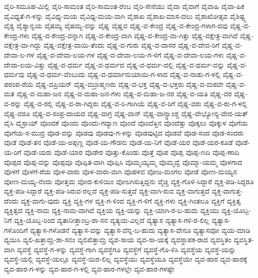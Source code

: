 ವೈರಿ-ಸಮೂಹ-ಮಿಲ್ಲಿ
ವೈರಿ-ಸಾಮಂತ
ವೈರಿ-ಸಾಮಂತ-ರೆಂಬ
ವೈರಿ-ಸೇನೆಯು
ವೈವಾ
ವೈವಾಗೆ
ವೈವಾಹಿ
ವೈವಾ-ಹಿಕ
ವೈವಿಧ್ಯತೆ-ಗ-ಳನ್ನು
ವೈವಿಧ್ಯ-ಮಯ
ವೈವಿಧ್ಯ-ಮಯ-ವಾಗಿ
ವೈಶಾಖ
ವೈಶಾಖ-ಮಾಸ-ದಲು
ವೈಶಾಖೋತ್ಸವ
ವೈಶಿಷ್ಟ್ಯ
ವೈಶ್ಯ
ವೈಶ್ಯಾನ್ವಯ
ವೈಷಮ್ಯ
ವೈಷಮ್ಯ-ವನ್ನು
ವೈಷ್ಣ
ವೈಷ್ಣವ
ವೈಷ್ಣ-ವ-ಕೇಂದ್ರ
ವೈಷ್ಣ-ವ-ಕೇಂದ್ರ-ಗಳಾಗ-ದವು
ವೈಷ್ಣ-ವ-ಕೇಂದ್ರ-ಗಳು
ವೈಷ್ಣ-ವ-ಕೇಂದ್ರ-ವನ್ನಾಗಿ
ವೈಷ್ಣ-ವ-ಕೇಂದ್ರ-ವಾಗಿ
ವೈಷ್ಣ-ವ-ಕೇಂದ್ರ-ವಾ-ಗಿತ್ತು
ವೈಷ್ಣ-ವಕ್ಷೇತ್ರ-ವಾಗಿದೆ
ವೈಷ್ಣ-ವಕ್ಷೇತ್ರ-ವಾ-ಗಿದ್ದು
ವೈಷ್ಣ-ವಕ್ಷೇತ್ರ-ವಾಯಿ-ತೆಂದು
ವೈಷ್ಣ-ವ-ಗುರು
ವೈಷ್ಣ-ವ-ದಾಸರ
ವೈಷ್ಣ-ವ-ದೇವ-ರಿಗೆ
ವೈಷ್ಣ-ವ-ದೇವಾ-ಲ-ಗಳ
ವೈಷ್ಣ-ವ-ದೇವಾ-ಲಯ-ಗಳ
ವೈಷ್ಣ-ವ-ದೇವಾ-ಲಯ-ಗ-ಳಿಗೆ
ವೈಷ್ಣ-ವ-ದೇವಾ-ಲಯ-ಗಳು
ವೈಷ್ಣ-ವ-ದೇವಾ-ಲಯ-ವಿತ್ತು
ವೈಷ್ಣ-ವ-ಧರ್ಮ
ವೈಷ್ಣ-ವ-ಧರ್ಮದ
ವೈಷ್ಣ-ವ-ಧರ್ಮ-ದಲ್ಲಿ
ವೈಷ್ಣ-ವ-ಧರ್ಮ-ವನ್ನು
ವೈಷ್ಣ-ವ-ಧರ್ಮವು
ವೈಷ್ಣ-ವ-ಧರ್ಮ-ವೆಂಬುದು
ವೈಷ್ಣ-ವ-ಧರ್ಮಾನುಯಾಯಿ-ಗ-ಳಾದ
ವೈಷ್ಣ-ವ-ನಾಡು-ಗ-ಳಲ್ಲಿ
ವೈಷ್ಣ-ವ-ಪರಂಪ-ರೆಯ
ವೈಷ್ಣ-ವಪ್ರಿಯನ್
ವೈಷ್ಣ-ವಬ್ರಾಹ್ಮಣರು
ವೈಷ್ಣ-ವ-ಭಕ್ತ
ವೈಷ್ಣ-ವ-ಭಕ್ತರು
ವೈಷ್ಣ-ವ-ಮಠವೇ
ವೈಷ್ಣ-ವ-ಮತ
ವೈಷ್ಣ-ವ-ಮಹಾ-ಜನ
ವೈಷ್ಣ-ವ-ಮಹಾ-ಜನ-ಗಳು
ವೈಷ್ಣ-ವ-ಮಹಾ-ಜ-ನರ
ವೈಷ್ಣ-ವ-ಯತಿ
ವೈಷ್ಣ-ವರ
ವೈಷ್ಣ-ವ-ರನ್ನು
ವೈಷ್ಣ-ವ-ರಲ್ಲಿ
ವೈಷ್ಣ-ವ-ರಾ-ಗಿದ್ದರು
ವೈಷ್ಣ-ವ-ರಿ-ಗಾಗಿಯೆ
ವೈಷ್ಣ-ವ-ರಿಗೆ
ವೈಷ್ಣ-ವರು
ವೈಷ್ಣ-ವ-ರು-ಗ-ಳಲ್ಲಿ
ವೈಷ್ಣ-ವರೂ
ವೈಷ್ಣ-ವ-ಸಂಪ್ರ-ದಾಯದ
ವೈಷ್ಣ-ವಾಗ್ರ
ವೈಷ್ಣ-ವಾನ್
ವೈಷ್ಣ-ವಾನ್ಸ್ತಾಂಶ್ಚ
ವೈಷ್ಣ-ವೇಭ್ಯೋನ್ಯ-ವೇದ-ಯತ್
ವೈಸಿ
ವೈಸ್ರಾಯ್
ವೊಂದಕೆ
ವೊಂದು
ವೊಂದು-ಗದ್ಯಾಣ
ವೊಂದೆ
ವೊಂದೆತ್ತಿನ
ವೊಂದೆತ್ತು
ವೊಕ್ಕಲು
ವೊಕ್ಕುಳ
ವೊಗೆಯ
ವೊಗೆಯ-ಸ-ಮುದ್ರ
ವೊಡ-ವನ್ನು
ವೊಡವು
ವೊಡವು-ಗ-ಳನ್ನು
ವೊಡವುಟ್ಟಿದ
ವೊಡವೆ
ವೊಡ-ಸಂದ
ವೊಡ-ಸಂದರು
ವೊಡೆ
ವೊಡೆ-ತನ
ವೊಡೆ-ಯ-ಅಪ್ಪಣ್ಣ
ವೊಡೆ-ಯ-ಗೌಡನು
ವೊಡೆ-ಯ-ನಿಗೆ
ವೊಡೆ-ಯರ
ವೊಡೆ-ಯರ-ಕೂಡೆ
ವೊಡೆ-ಯ-ರಿಗೆ
ವೊಡೆ-ಯರು
ವೊಡೆ-ಯಾರ
ವೊಡೇರ
ವೊತ್ತು-ಕೊಂಡು
ವೊತ್ತೆ
ವೊಪ
ವೊಪ್ಪ
ವೊಪ್ಪ-ಣದಿ
ವೊಪ್ಪ-ಣಾದಿ
ವೊಪ್ಪದ
ವೊಪ್ಪ-ವನ್ನು
ವೊಪ್ಪವೂ
ವೊಪ್ಪಿತ-ವಾಗಿ
ವೊಪ್ಪಿಸಿ
ವೊಮ್ಮಯ್ಯಮ್ಮ
ವೊಮ್ಮವ್ವೆ
ವೊಮ್ಮಾ-ಯಮ್ಮ
ವೊಳಗಾದ
ವೊಳಗೆ
ವೊಳಗೆ-ರೆಯ
ವೊಳ-ವಾರು
ವೊಳ-ವಾರು-ವಾಗಿ
ವೊಹಳವ
ವೋಜ-ಮಂಗಲ
ವೋಡೆ
ವೋಣ-ಮಯ್ಯನ
ವೋಣ-ಮಯ್ಯ-ನೆಂದು
ವೋತ್ತಮ
ವೋದ-ಕುಳಿಯಿಂ
ವೋಲಗಿಸುತ್ತಿದ್ದನು
ವ್ಮೆಚ್ಚಿ
ವ್ಯಕ್ತ-ಗೊಳಿ-ಸಿದ್ದಾರೆ
ವ್ಯಕ್ತ-ಪಡಿ-ಸಿದ್ದರೂ
ವ್ಯಕ್ತ-ಪಡಿ-ಸಿದ್ದಾರೆ
ವ್ಯಕ್ತ-ಪಡಿ-ಸಿರುವ-ರಲ್ಲದೆ
ವ್ಯಕ್ತ-ಪಡಿ-ಸುತ್ತದೆ
ವ್ಯಕ್ತ-ವಾಗಿ-ರುವ
ವ್ಯಕ್ತ-ವಾಗುತ್ತದೆ
ವ್ಯಕ್ತ-ವಾಗುತ್ತ-ದೆಂದು
ವ್ಯಕ್ತ-ವಾಗು-ವುದು
ವ್ಯಕ್ತಿ
ವ್ಯಕ್ತಿ-ಗಳ
ವ್ಯಕ್ತಿ-ಗ-ಳಿಂದ
ವ್ಯಕ್ತಿ-ಗ-ಳಿಗೆ
ವ್ಯಕ್ತಿ-ಗಳು
ವ್ಯಕ್ತಿ-ಗಿಂತಲೂ
ವ್ಯಕ್ತಿಗೆ
ವ್ಯಕ್ತಿತ್ವ
ವ್ಯಕ್ತಿತ್ವದ
ವ್ಯಕ್ತಿ-ನಾಮ
ವ್ಯಕ್ತಿ-ನಾಮ-ವಾಗಿದೆ
ವ್ಯಕ್ತಿಯ
ವ್ಯಕ್ತಿ-ಯನ್ನು
ವ್ಯಕ್ತಿ-ಯಾಗಿ-ರ-ಬ-ಹುದು
ವ್ಯಕ್ತಿಯು
ವ್ಯಕ್ತಿ-ಯೊಬ್ಬ-ನಿಗೆ
ವ್ಯಕ್ತಿ-ಯೊಬ್ಬ-ರಿಂದ
ವ್ಯತಾನೀತ್ತಾಂಬ್ರ-ಶಾ-ಸನ
ವ್ಯತ್ಯಯ-ವಿಲ್ಲದೆ
ವ್ಯತ್ಯಾಸ
ವ್ಯತ್ಯಾಸ-ಗಳಿ-ರ-ಲಿಲ್ಲ
ವ್ಯತ್ಯಾಸ-ಗಳೊಂದಿಗೆ
ವ್ಯತ್ಯಾಸ-ಗಳೊಡನೆ
ವ್ಯತ್ಯಾಸ-ವನ್ನು
ವ್ಯತ್ಯಾಸ-ವೆನ್ನ-ಬ-ಹುದು
ವ್ಯತ್ಯಾಸ-ವೇನೂ
ವ್ಯತ್ಯಾಸವೋ
ವ್ಯಯ-ಮಾಡಿ
ವ್ಯಯಿಸಿ
ವ್ಯಲಿ-ಖತ್ತಾಮ್ರ-ಶಾ-ಸನಂ
ವ್ಯಲಿಖಿತ್ತಾಮ್ರ
ವ್ಯವ-ಸಾಯ
ವ್ಯವ-ಸಾ-ಯಕ್ಕೆ
ವ್ಯವಸ್ಥಾಪಕ-ರಾದ
ವ್ಯವಸ್ಥಿತಂ
ವ್ಯವಸ್ಥಿತ-ವಾಗಿ
ವ್ಯವಸ್ಥೆ
ವ್ಯವಸ್ಥೆ-ಗ-ಳನ್ನು
ವ್ಯವಸ್ಥೆ-ಗಾಗಿ
ವ್ಯವಸ್ಥೆಗೂ
ವ್ಯವಸ್ಥೆಗೆ
ವ್ಯವಸ್ಥೆ-ಗೊ-ಳಿಸಿ
ವ್ಯವಸ್ಥೆಯ
ವ್ಯವಸ್ಥೆ-ಯನ್ನು
ವ್ಯವಸ್ಥೆ-ಯಲ್ಲಿ
ವ್ಯವಸ್ಥೆ-ಯಲ್ಲೂ
ವ್ಯವಸ್ಥೆ-ಯಿರ-ಲಿಲ್ಲ
ವ್ಯವಸ್ಥೆಯು
ವ್ಯವಸ್ಥೆಯೂ
ವ್ಯವಸ್ಥೆಯೇ
ವ್ಯವ-ಹಾರ
ವ್ಯವ-ಹಾರಕ್ಕೆ
ವ್ಯವ-ಹಾರ-ಗ-ಳನ್ನು
ವ್ಯವ-ಹಾರ-ಗ-ಳಲ್ಲಿ
ವ್ಯವ-ಹಾರ-ಗಳಲ್ಲೇ
ವ್ಯವ-ಹಾರ-ಗಳಷ್ಟೇ
